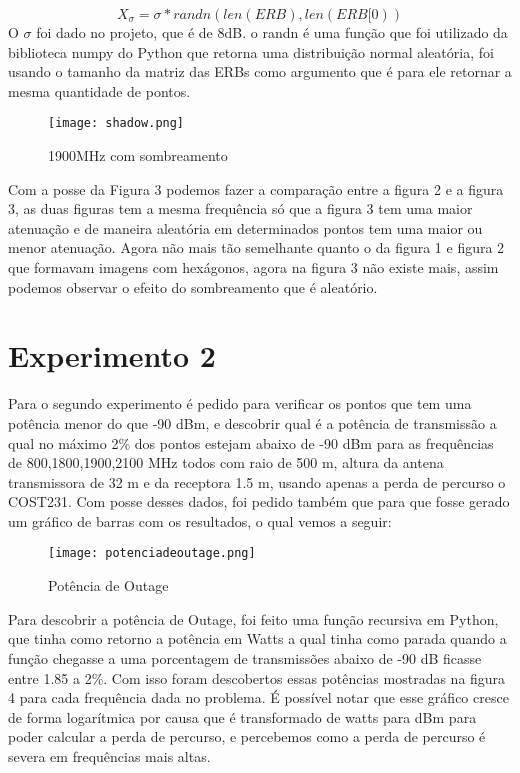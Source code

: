 \documentclass[12pt]{article}
\begin{document}
\begin{equation}
    X{_{\sigma }}= \sigma * randn(len(ERB),len(ERB[0))
\end{equation}
O $\sigma$ foi dado no projeto, que é de 8dB. o randn é uma função que foi utilizado da biblioteca numpy do Python que retorna uma distribuição normal aleatória, foi usando o tamanho da matriz das ERBs como argumento que é para ele retornar a mesma quantidade de pontos.
\begin{figure}[h!]
    \texttt{[image: shadow.png]}
    \caption{1900MHz com sombreamento}
\end{figure}
\FloatBarrier
Com a posse da Figura 3 podemos fazer a comparação entre a figura 2 e a figura 3, as duas figuras tem a mesma frequência só que a figura 3 tem uma maior atenuação e de maneira aleatória em determinados pontos tem uma maior ou menor atenuação. Agora não mais tão semelhante quanto o da figura 1 e figura 2 que formavam imagens com hexágonos, agora na figura 3 não existe mais, assim podemos observar o efeito do sombreamento que é aleatório.

\section{Experimento 2}
Para o segundo experimento é pedido para verificar os pontos que tem uma potência menor do que -90 dBm, e descobrir qual é a potência de transmissão a qual no máximo 2\% dos pontos estejam abaixo de -90 dBm para as frequências de 800,1800,1900,2100 MHz todos com raio de 500 m, altura da antena transmissora de 32 m e da receptora 1.5 m, usando apenas a perda de percurso o COST231. Com posse desses dados, foi pedido também que para que fosse gerado um gráfico de barras com os resultados, o qual vemos a seguir:
\begin{figure}[h!]
    \centering
    \texttt{[image: potenciadeoutage.png]}
    \caption{Potência de Outage}
    \label{fig:my_label}
\end{figure}
\FloatBarrier
Para descobrir a potência de Outage, foi feito uma função recursiva em Python, que tinha como retorno a potência em Watts a qual tinha como parada quando a função chegasse a uma porcentagem de transmissões abaixo de -90 dB ficasse entre 1.85 a 2\%. Com isso foram descobertos essas potências mostradas na figura 4 para cada frequência dada no problema.
É possível notar que esse gráfico cresce de forma logarítmica por causa que é transformado de watts para dBm para poder calcular a perda de percurso, e percebemos como a perda de percurso é severa em frequências mais altas.
\end{document}
